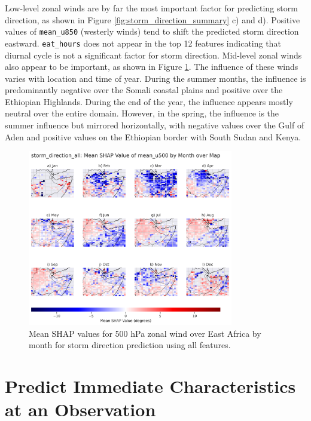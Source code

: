 Low-level zonal winds are by far the most important factor for predicting storm direction, as shown in Figure \ref{fig:storm_direction_summary} c) and d). Positive values of \texttt{mean\_u850} (westerly winds) tend to shift the predicted storm direction eastward. \texttt{eat\_hours} does not appear in the top 12 features indicating that diurnal cycle is not a significant factor for storm direction. Mid-level zonal winds also appear to be important, as shown in Figure \ref{fig:storm_direction_all_shap_mean_u500_map_by_month}. The influence of these winds varies with location and time of year. During the summer months, the influence is predominantly negative over the Somali coastal plains and positive over the Ethiopian Highlands. During the end of the year, the influence appears mostly neutral over the entire domain. However, in the spring, the influence is the summer influence but mirrored horizontally, with negative values over the Gulf of Aden and positive values on the Ethiopian border with South Sudan and Kenya.

\begin{figure}[ht]
    \centering
    \includegraphics[width=0.8\textwidth]{../figures/generated/experiments/storm_direction/geographic_corr/storm_direction_all_shap_mean_u500_map_by_month.png}
    \caption{Mean SHAP values for 500 hPa zonal wind over East Africa by month for storm direction prediction using all features.}
    \label{fig:storm_direction_all_shap_mean_u500_map_by_month}
\end{figure}

\clearpage
\section{Predict Immediate Characteristics at an Observation}


